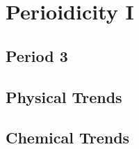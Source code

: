 \documentclass[../main]{subfiles}
\begin{document}
\section{Perioidicity I}

	\subsection{Period 3}

	\subsection{Physical Trends}

	\subsection{Chemical Trends}
\end{document}
